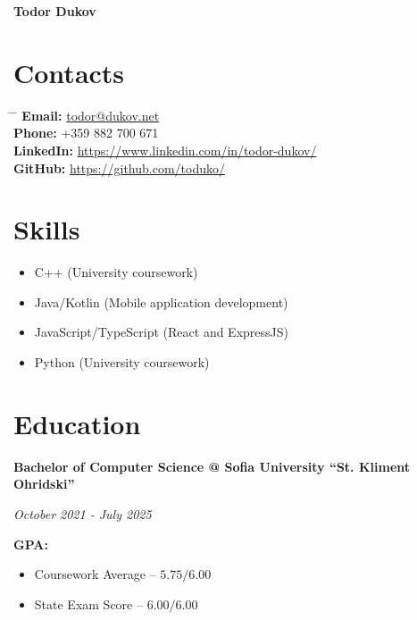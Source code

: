 \documentclass[a4paper,10pt]{article}
\begin{document}
\begin{center}
    \huge{\textbf{Todor Dukov}}
\end{center}

\begin{multicols}{2}
    \section*{Contacts}

    \begin{tabbing}
        \hspace{2cm} \= \hspace{8cm} \= \kill
        \textbf{Email:} \> \href{mailto:todor@dukov.net}{todor@dukov.net} \\
        \textbf{Phone:} \> +359 882 700 671 \\
        \textbf{LinkedIn:} \> \href{https://www.linkedin.com/in/todor-dukov/}{https://www.linkedin.com/in/todor-dukov/} \\
        \textbf{GitHub:} \> \href{https://github.com/toduko/}{https://github.com/toduko/} \\
    \end{tabbing}

    \section*{Skills}

    \begin{itemize}
        \item C++ (University coursework)
        \item Java/Kotlin (Mobile application development)
        \item JavaScript/TypeScript (React and ExpressJS)
        \item Python (University coursework)
    \end{itemize}
\end{multicols}

\section*{Education}

\textbf{Bachelor of Computer Science @ Sofia University “St. Kliment Ohridski”}

\textit{October 2021 - July 2025}

\textbf{GPA:} 
\begin{itemize}
  \item Coursework Average -- $5.75/6.00$
  \item State Exam Score -- $6.00/6.00$
\end{itemize}
\end{document}
